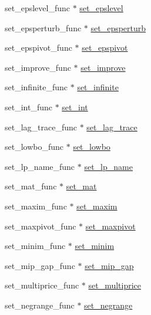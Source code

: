 \begin{DoxyCompactItemize}
\item 
set\+\_\+epslevel\+\_\+func $\ast$ \hyperlink{struct__lprec_a77ba3de5f4f05702103d3af48bf78327}{set\+\_\+epslevel}
\item 
set\+\_\+epsperturb\+\_\+func $\ast$ \hyperlink{struct__lprec_a6123a60e93ad0fb950288ef94501027f}{set\+\_\+epsperturb}
\item 
set\+\_\+epspivot\+\_\+func $\ast$ \hyperlink{struct__lprec_aabca4dacd78113ef1445c80bfa976928}{set\+\_\+epspivot}
\item 
set\+\_\+improve\+\_\+func $\ast$ \hyperlink{struct__lprec_aff7726090e7a14367360400016b6f653}{set\+\_\+improve}
\item 
set\+\_\+infinite\+\_\+func $\ast$ \hyperlink{struct__lprec_a55fd053d440a23e65ea64a5eace1e898}{set\+\_\+infinite}
\item 
set\+\_\+int\+\_\+func $\ast$ \hyperlink{struct__lprec_add9d92d4f5062c3919d2fc7f0dd81e0e}{set\+\_\+int}
\item 
set\+\_\+lag\+\_\+trace\+\_\+func $\ast$ \hyperlink{struct__lprec_a126277b07e719b4b63cfee93e398f6e7}{set\+\_\+lag\+\_\+trace}
\item 
set\+\_\+lowbo\+\_\+func $\ast$ \hyperlink{struct__lprec_a560b9189cbf449674b66d12eada2ffac}{set\+\_\+lowbo}
\item 
set\+\_\+lp\+\_\+name\+\_\+func $\ast$ \hyperlink{struct__lprec_a87b0a026a7eb3333c1438a1fb1cca7cb}{set\+\_\+lp\+\_\+name}
\item 
set\+\_\+mat\+\_\+func $\ast$ \hyperlink{struct__lprec_a6949271309611be508eec7ee21e6ad84}{set\+\_\+mat}
\item 
set\+\_\+maxim\+\_\+func $\ast$ \hyperlink{struct__lprec_affa5f12937cfb1d0974215b987dcd1cd}{set\+\_\+maxim}
\item 
set\+\_\+maxpivot\+\_\+func $\ast$ \hyperlink{struct__lprec_aec349c8ce677c8e4d45f5c513a3bd785}{set\+\_\+maxpivot}
\item 
set\+\_\+minim\+\_\+func $\ast$ \hyperlink{struct__lprec_ab169d9dbb534502c59a84f57658bd0cf}{set\+\_\+minim}
\item 
set\+\_\+mip\+\_\+gap\+\_\+func $\ast$ \hyperlink{struct__lprec_a515df09251142ea42d3634dff9b6d4cb}{set\+\_\+mip\+\_\+gap}
\item 
set\+\_\+multiprice\+\_\+func $\ast$ \hyperlink{struct__lprec_a5d5cb29fb51633f1f4d72a8367a0b7cc}{set\+\_\+multiprice}
\item 
set\+\_\+negrange\+\_\+func $\ast$ \hyperlink{struct__lprec_aae7ce28eb9a4504651cce983a50f71e4}{set\+\_\+negrange}
\item 

\end{DoxyCompactItemize}
